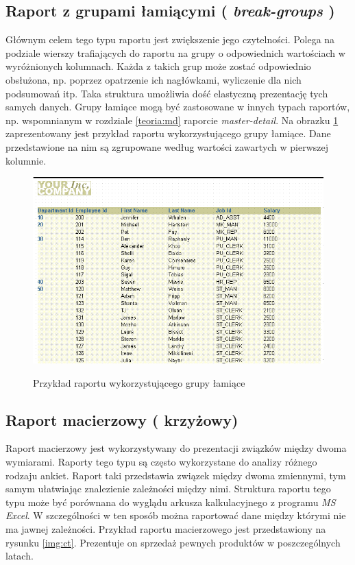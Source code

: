 \documentclass[11pt,a4paper]{article}
\begin{document}
\subsection{Raport z grupami łamiącymi ( \emph{break-groups} )} \label{teoria:bg}
Głównym celem tego typu raportu jest zwiększenie jego czytelności. Polega na podziale wierszy trafiających do raportu na grupy o odpowiednich wartościach w wyróżnionych kolumnach. Każda z takich grup może zostać odpowiednio obsłużona, np. poprzez opatrzenie ich nagłówkami, wyliczenie dla nich podsumowań itp. Taka struktura umożliwia dość elastyczną prezentację tych samych danych. Grupy łamiące mogą być zastosowane w innych typach raportów, np. wspomnianym w rozdziale \ref{teoria:md} raporcie \emph{master-detail}. Na obrazku \ref{img:bg} zaprezentowany jest przykład raportu wykorzystującego grupy łamiące. Dane przedstawione na nim są zgrupowane według wartości zawartych w pierwszej kolumnie.
\begin{figure}[h]
\centering
\caption{Przykład raportu wykorzystującego grupy łamiące}
\includegraphics[scale=0.7]{grp1col_lft1_out1}
\label{img:bg}
\end{figure}

\subsection{Raport macierzowy ( krzyżowy) } \label{teoria:ct}
Raport macierzowy jest wykorzystywany do prezentacji związków między dwoma wymiarami. Raporty tego typu są często wykorzystane do analizy różnego rodzaju ankiet. Raport taki przedstawia związek między dwoma zmiennymi, tym samym ułatwiając znalezienie zależności między nimi. Struktura raportu tego typu może być porównana do wyglądu arkusza kalkulacyjnego z programu \emph{MS Excel}. W szczególności w ten sposób można raportować dane między którymi nie ma jawnej zależności. Przykład raportu macierzowego jest przedstawiony na rysunku \ref{img:ct}. Prezentuje on sprzedaż pewnych produktów w poszczególnych latach. 
\end{document}

